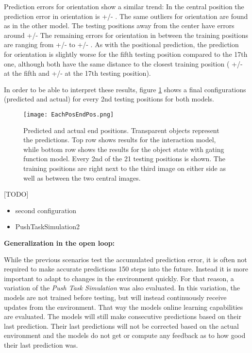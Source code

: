 Prediction errors for orientation show a similar trend: 
In the central position the prediction error in orientation is  +/- .
The same outliers for orientation are found as in the other model. The testing positions  away from the center have errors around  +/- 
The remaining errors for orientation in between the training positions are ranging from  +/-  to  +/- .
As with the positional prediction, the prediction for orientation is slightly worse for the fifth testing position compared to the 17th one, although both have the same distance to the closest training position ( +/-  at the fifth and  +/-  at the 17th testing position).

In order to be able to interpret these results, figure \ref{fig:EachPosEndPos} shows a final configurations (predicted and actual) for every 2nd testing positions for both models.

\begin{figure}
\centering
\texttt{[image: EachPosEndPos.png]}
\caption{Predicted and actual end positions. Transparent objects represent the predictions. Top row shows results for the interaction model, while bottom row shows the results for the object state with gating function model. Every 2nd of the 21 testing positions is shown. The training positions are right next to the third image on either side as well as between the two central images.}
\label{fig:EachPosEndPos}
\end{figure}

[TODO]
\begin{itemize}
\item second configuration
\item PushTaskSimulation2
\end{itemize}

\textbf{Generalization in the open loop:}

While the previous scenarios test the accumulated prediction error, it is often not required to make accurate predictions 150 steps into the future. Instead it is more important to adapt to changes in the environment quickly. For that reason, a variation of the \textit{Push Task Simulation} was also evaluated. In this variation, the models are not trained before testing, but will instead continuously receive updates from the environment. That way the models online learning capabilities are evaluated. The models will still make consecutive predictions based on their last prediction. Their last predictions will not be corrected based on the actual environment and the models do not get or compute any feedback as to how good their last prediction was. 

